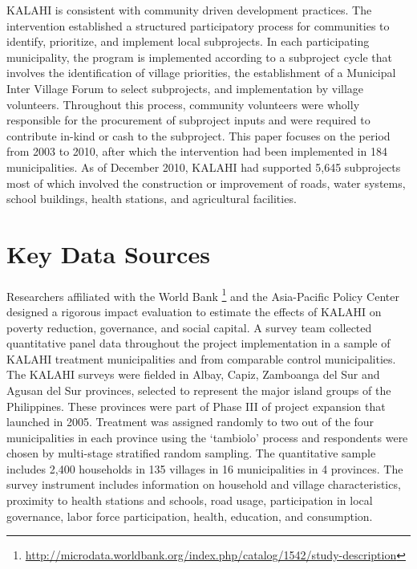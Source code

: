 \documentclass[12pt]{article}
\begin{document}
	KALAHI is consistent with community driven development practices. The intervention established a structured participatory process for communities to identify, prioritize, and implement local subprojects. In each participating municipality, the program is implemented according to a subproject cycle that involves the identification of village priorities, the establishment of a Municipal Inter Village Forum to select subprojects, and implementation by village volunteers. Throughout this process, community volunteers were wholly responsible for the procurement of subproject inputs and were required to contribute in-kind or cash to the subproject. This paper focuses on the period from 2003 to 2010, after which the intervention had been implemented in 184 municipalities. As of December 2010, KALAHI had supported 5,645 subprojects most of which involved the construction or improvement of roads, water systems, school buildings, health stations, and agricultural facilities. 
	

\section{Key Data Sources}
	
	\paragraph{} Researchers affiliated with the World Bank
		\footnote{\url{http://microdata.worldbank.org/index.php/catalog/1542/study-description}}
	and the Asia-Pacific Policy Center designed a rigorous impact evaluation to estimate the effects of KALAHI on poverty reduction, governance, and social capital. A survey team collected quantitative panel data throughout the project implementation in a sample of KALAHI treatment municipalities and from comparable control municipalities. The KALAHI surveys were fielded in Albay, Capiz, Zamboanga del Sur and Agusan del Sur provinces, selected to represent the major island groups of the Philippines. These provinces were part of Phase III of project expansion that launched in 2005. Treatment was assigned randomly to two out of the four municipalities in each province using the `tambiolo' process and respondents were chosen by multi-stage stratified random sampling. The quantitative sample includes 2,400 households in 135 villages in 16 municipalities in 4 provinces. The survey instrument includes information on household and village characteristics, proximity to health stations and schools, road usage, participation in local governance, labor force participation, health, education, and consumption. 
\end{document}
